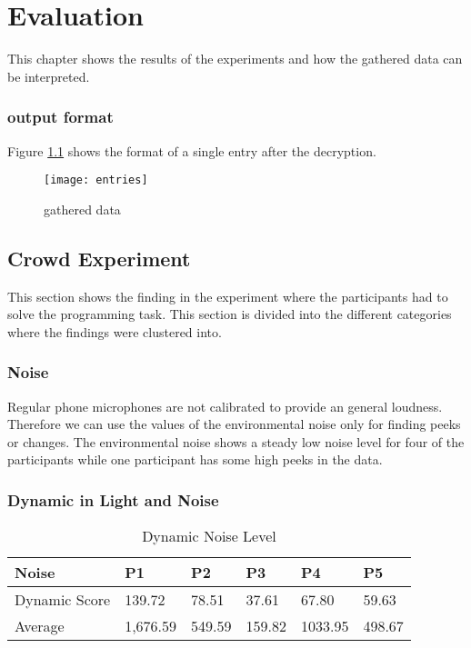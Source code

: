 \chapter{Evaluation}
This chapter shows the results of the experiments and how the gathered data can be interpreted. 

\subsection{output format}
Figure \ref{entries} shows the format of a single entry after the decryption. 

\begin{figure}[!htb]
\centering
\texttt{[image: entries]}
\caption{gathered data}\label{entries}
\vspace{10 mm}
\end{figure}

\FloatBarrier

\section{Crowd Experiment}
This section shows the finding in the experiment where the participants had to solve the programming task. This section is divided into the different categories where the findings were clustered into. 

\subsection{Noise}
Regular phone microphones are not calibrated to provide an general loudness. Therefore we can use the values of the environmental noise only for finding peeks or changes.
The environmental noise shows a steady low noise level for four of the participants while one participant has some high peeks in the data. 

\subsection{Dynamic in Light and Noise}
\FloatBarrier

\begin{table}[ht]
  \begin{tabular}{|P{3cm}|P{1.6cm}|P{1.6cm}|P{1.6cm}|P{1.6cm}|P{1.6cm}|}
   	\textbf{Noise}				& \textbf{P1}			& \textbf{P2}			& 	\textbf{P3}		& 	\textbf{P4}			& 	\textbf{P5}	\\ \hline
  	Dynamic Score				& 139.72					& 78.51					& 37.61				& 67.80					& 59.63			\\ \hline
  	Average 						& 1,676.59				& 549.59					& 159.82				& 1033.95				& 498.67			\\ \hline
  	\end{tabular}
  	\newline\newline
  	\caption{Dynamic Noise Level}\label{dynNoise}
\end{table}

